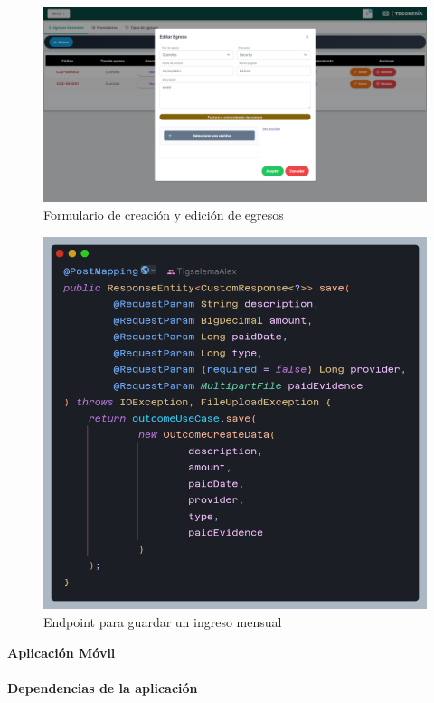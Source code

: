 \begin{figure}[H]
    \centering
    \includegraphics[width=1\textwidth]{resources/images/sw-tesoreria-egresos-form}
    \caption{Formulario de creación y edición de egresos}
    \label{fig:sw-tesoreria-egreso-form}
\end{figure}

\begin{figure}[H]
    \centering
    \includegraphics[width=1\textwidth]{resources/images/api-egreso-save}
    \caption{Endpoint para guardar un ingreso mensual}
    \label{fig:api-tesoreria-egreso-save}
\end{figure}

\textbf{Aplicación Móvil}
\bigbreak
\paragraph{Dependencias de la aplicación}

